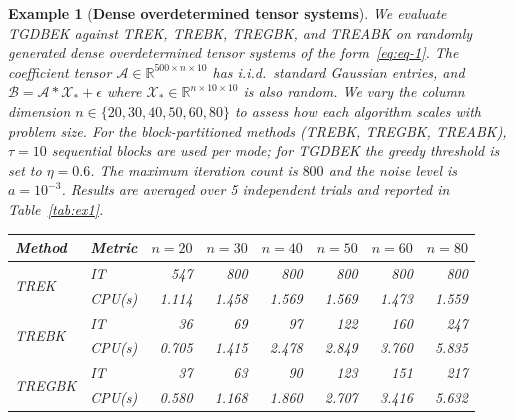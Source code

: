 \documentclass[11pt]{article}
\newtheorem{example}[theorem]{Example}
\def\fm#1{\mathcal{#1}}
\begin{document}
\begin{example}[\textbf{Dense overdetermined tensor systems}] \label{ex:dense}
We evaluate TGDBEK against TREK, TREBK, TREGBK, and TREABK on randomly generated dense overdetermined tensor systems of the form~\eqref{eq:eq-1}. The coefficient tensor $\fm A \in \mathbb{R}^{500\times n\times 10}$ has i.i.d.\ standard Gaussian entries, and $\fm B = \fm A * \fm X_\ast + \fm\epsilon$ where $\fm X_\ast \in \mathbb{R}^{n\times 10\times 10}$ is also random. We vary the column dimension $n\in\{20,30,40,50,60,80\}$ to assess how each algorithm scales with problem size. For the block-partitioned methods (TREBK, TREGBK, TREABK), $\tau=10$ sequential blocks are used per mode; for TGDBEK the greedy threshold is set to $\eta=0.6$. The maximum iteration count is $800$ and the noise level is $a=10^{-3}$. Results are averaged over 5 independent trials and reported in Table~\ref{tab:ex1}.
%
%
\begin{table}[htbp]
\centering
\small
\setlength{\tabcolsep}{4pt}
\begin{tabular}{llrrrrrr}
\toprule
Method & Metric & $n=20$ & $n=30$ & $n=40$ & $n=50$ & $n=60$ & $n=80$ \\
\midrule
\multirow{2}{*}{TREK}
  & IT     & 547   & 800   & 800   & 800   & 800   & 800   \\
  & CPU(s) & 1.114 & 1.458 & 1.569 & 1.569 & 1.473 & 1.559 \\
\midrule
\multirow{2}{*}{TREBK}
  & IT     & 36    & 69    & 97    & 122   & 160   & 247   \\
  & CPU(s) & 0.705 & 1.415 & 2.478 & 2.849 & 3.760 & 5.835 \\
\midrule
\multirow{2}{*}{TREGBK}
  & IT     & 37    & 63    & 90    & 123   & 151   & 217   \\
  & CPU(s) & 0.580 & 1.168 & 1.860 & 2.707 & 3.416 & 5.632 \\

\end{tabular}
\end{table}
\end{example}
\end{document}
